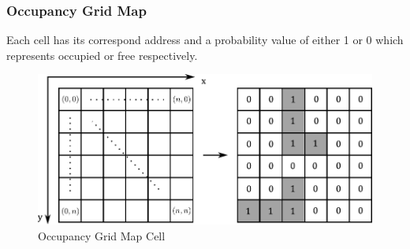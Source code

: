 \begin{frame}
	\frametitle{Occupancy Grid Map}
	Each cell has its correspond address and a probability value of either 1 or 0 which represents occupied or free respectively.
	\begin{figure}[h]
		\caption{Occupancy Grid Map Cell}
		\includegraphics[scale=0.7]{image/ocm_value.pdf}
	\end{figure}
\end{frame}



